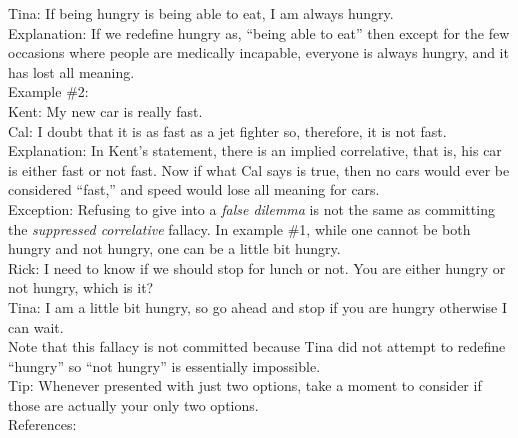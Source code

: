 \documentclass[a4paper,12pt,single,pdftex]{scrartcl}
\begin{document}
    
      Tina: If being hungry is being able to eat, I am always hungry.
    \\

    
      Explanation: If we redefine hungry as, “being able to eat” then except for the few occasions where people are medically incapable, everyone is always hungry, and it has lost all meaning.
    \\

    
      Example \#2:
    \\

    
      Kent: My new car is really fast.
    \\

    
      Cal: I doubt that it is as fast as a jet fighter so, therefore, it is not fast.
    \\

    
      Explanation: In Kent’s statement, there is an implied correlative, that is, his car is either fast or not fast.  Now if what Cal says is true, then no cars would ever be considered “fast,” and speed would lose all meaning for cars.
    \\

    
      Exception: Refusing to give into a {\it false dilemma} is not the same as committing the {\it suppressed correlative} fallacy.  In example \#1, while one cannot be both hungry and not hungry, one can be a little bit hungry.
    \\

    
      Rick: I need to know if we should stop for lunch or not.  You are either hungry or not hungry, which is it?
    \\

    
      Tina: I am a little bit hungry, so go ahead and stop if you are hungry otherwise I can wait.
    \\

    
      Note that this fallacy is not committed because Tina did not attempt to redefine “hungry” so “not hungry” is essentially impossible.
    \\

    
      Tip: Whenever presented with just two options, take a moment to consider if those are actually your only two options.
    \\

    References:

    
      
        
      \\

      
        
\end{document}
